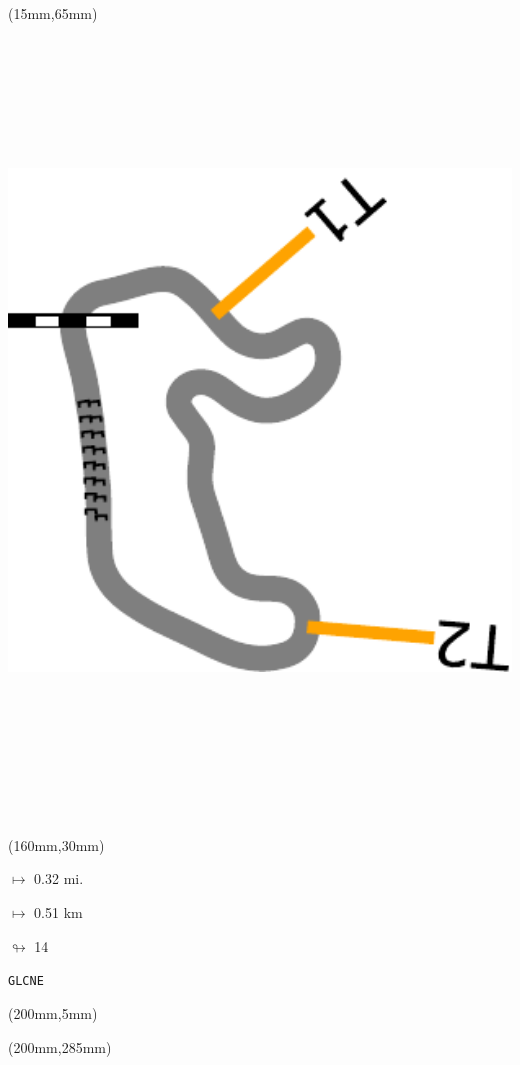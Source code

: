 \begin{textblock*}{185mm}(15mm,65mm)%
\centering
\mbox{\includegraphics[width=185mm,height=210mm,keepaspectratio]{PT/GLCNE.pdf}}
\end{textblock*}
\begin{textblock*}{40mm}(160mm,30mm)%
\Large
\par$\mapsto$ 0.32 mi.
\par$\mapsto$ 0.51 km
\par$\looparrowright$ 14
\par\hfill\tiny\tt GLCNE\\
\end{textblock*}
\begin{textblock*}{20mm}(200mm,5mm)%
\fbox{\thepage}
\label{GLCNE}
\end{textblock*}
\begin{textblock*}{20mm}(200mm,285mm)%
\fbox{\thepage}
\end{textblock*}


